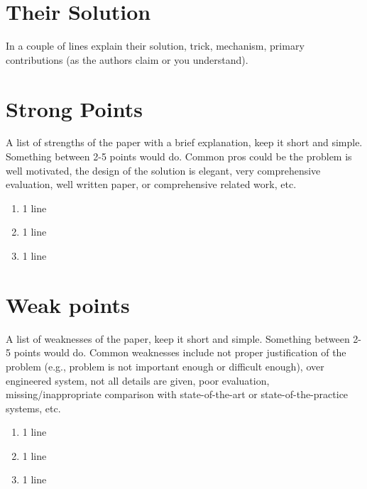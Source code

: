 \documentclass[sigconf,10pt, screen]{acmart}
\begin{document}
\section{Their Solution}
In a couple of lines explain their solution, trick, mechanism, primary contributions (as the authors claim or you understand). 

\section{Strong Points}
A list of strengths of the paper with a brief explanation, keep it short and simple. Something between 2-5 points would do.  Common pros could be the problem is well motivated, the design of the solution is elegant, very comprehensive evaluation, well written paper, or comprehensive related work, etc. 
\begin{enumerate}
    \item 1 line 
    \item 1 line 
    \item 1 line 
\end{enumerate}

\section{Weak points}
A list of weaknesses of the paper, keep it short and simple. Something between 2-5 points would do. Common weaknesses include not proper justification of the problem (e.g., problem is not important enough or difficult enough), over engineered system, not all details are given, poor evaluation, missing/inappropriate comparison with state-of-the-art or state-of-the-practice systems, etc. 
\begin{enumerate}
    \item 1 line 
    \item 1 line 
    \item 1 line 
\end{enumerate}
\end{document}
